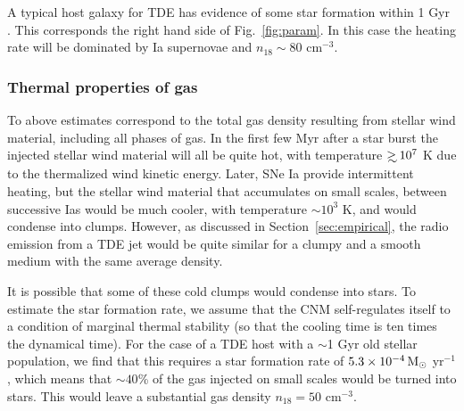 \documentclass[usenatbib,fleqn]{mnras}
\newcommand\gsim{\mathrel{\rlap{\lower4pt\hbox{\hskip1pt$\sim$}}
    \raise1pt\hbox{$>$}}}
\newcommand{\Msun}{{\rm M_\odot}}
\begin{document}
A typical host galaxy for TDE has evidence of some star formation
within 1 Gyr \citep{French+2016}. This corresponds the right hand side
of Fig.~\ref{fig:param}. In this case the heating rate will be
dominated by Ia supernovae and $n_{18}\sim 80$ cm$^{-3}$.

\subsubsection{Thermal properties of gas}

To above estimates correspond to the total gas density resulting from
stellar wind material, including all phases of gas. In the first few
Myr after a star burst the injected stellar wind material will all be
quite hot, with temperature $\gsim 10^{7}$ K due to the thermalized
wind kinetic energy. Later, SNe Ia provide intermittent heating, but
the stellar wind material that accumulates on small scales, between
successive Ias would be much cooler, with temperature $\sim 10^{3}$ K,
and would condense into clumps. However, as discussed in
Section~\ref{sec:empirical}, the radio emission from a TDE jet would
be quite similar for a clumpy and a smooth medium with the same
average density.



It is possible that some of these cold clumps would condense into
stars. To estimate the star formation rate, we assume that the CNM
self-regulates itself to a condition of marginal thermal stability (so
that the cooling time is ten times the dynamical time). For the case
of a TDE host with a $\sim$1 Gyr old stellar population, we find that
this requires a star formation rate of  $5.3 \times 10^{-4}
\,\Msun$ yr$^{-1}$, which means that $\sim 40$\% of the gas injected
on small scales would be turned into stars. This would leave a
substantial gas density $n_{18}=50$ cm$^{-3}$.
\end{document}
